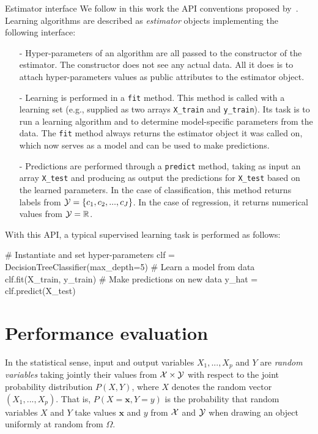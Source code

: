 \begin{remark}{Estimator interface}
We follow in this work the API conventions proposed by~\citet{buitinck:2013}.
Learning algorithms are described as \textit{estimator} objects implementing the
following interface:

\begin{itemize}
\item[-] Hyper-parameters of an algorithm are all passed to the constructor of the
estimator. The constructor does not see any actual data. All it does
is to attach hyper-parameters values as public attributes to the estimator object.
\item[-] Learning is performed in a \texttt{fit} method. This method is called with
a learning set (e.g., supplied as two arrays \texttt{X\_train} and \texttt{y\_train}). Its
task is to run a learning algorithm and to determine model-specific parameters
from the data. The \texttt{fit} method always returns the estimator object
it was called on, which now serves as a model and can be used to make predictions.
\item[-] Predictions are performed through a \texttt{predict} method, taking
as input an array \texttt{X\_test} and producing as output the predictions for
\texttt{X\_test} based on the learned parameters. In the case of classification,
this method returns labels from ${\cal Y} = \{c_1, c_2, ..., c_J\}$. In the case of regression,
it returns numerical values from ${\cal Y} = \mathbb{R}$.
\end{itemize}

With this API, a typical supervised learning task is performed as follows:

\vskip0.3cm
\begin{pythoncode}
# Instantiate and set hyper-parameters
clf = DecisionTreeClassifier(max_depth=5)
# Learn a model from data
clf.fit(X_train, y_train)
# Make predictions on new data
y_hat = clf.predict(X_test)
\end{pythoncode}
\end{remark}


\section{Performance evaluation}
\label{sec:2:performance-evaluation}

In the statistical sense, input and output variables $X_1, ..., X_p$ and $Y$
are \textit{random variables} taking jointly their values from ${\cal X} \times
{\cal Y}$ with respect to the joint probability distribution $P(X, Y)$, where
$X$ denotes the random vector $(X_1, ..., X_p)$. That is, $P(X=\mathbf{x},
Y=y)$ is the probability that random variables $X$ and $Y$ take values
$\mathbf{x}$ and $y$ from ${\cal X}$ and ${\cal Y}$ when drawing an object
uniformly at random from $\Omega$.


